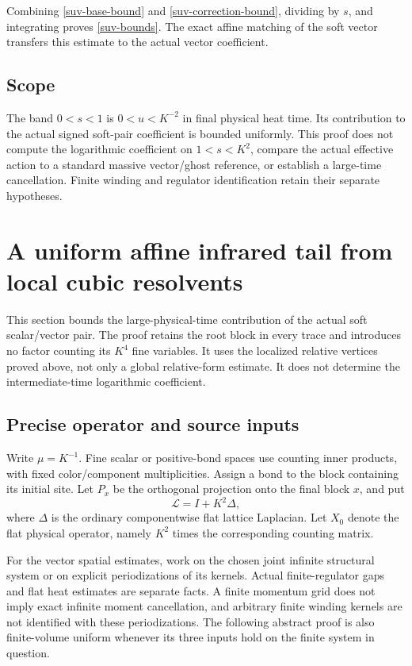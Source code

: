 \documentclass[11pt]{article}
\theoremstyle{remark}
\begin{document}
Combining \eqref{suv-base-bound} and \eqref{suv-correction-bound},
dividing by $s$, and integrating proves \eqref{suv-bounds}.
The exact affine matching of the soft vector transfers this estimate
to the actual vector coefficient.

\subsection{Scope}
\label{suv-scope}

The band $0<s<1$ is $0<u<K^{-2}$ in final physical heat time.
Its contribution to the actual signed soft-pair coefficient is bounded
uniformly. This proof does not compute the logarithmic coefficient on
$1<s<K^2$, compare the actual effective action to a standard massive
vector/ghost reference, or establish a large-time cancellation.
Finite winding and regulator identification retain their separate
hypotheses.


\section{A uniform affine infrared tail from local cubic resolvents}
\label{sft-section}

This section bounds the large-physical-time contribution of the actual
soft scalar/vector pair. The proof retains the root block in every
trace and introduces no factor counting its \(K^4\) fine variables.
It uses the localized relative vertices proved above, not only a
global relative-form estimate. It does not determine the
intermediate-time logarithmic coefficient.

\subsection{Precise operator and source inputs}
\label{sft-input-section}

Write \(\mu=K^{-1}\). Fine scalar or positive-bond spaces use counting
inner products, with fixed color/component multiplicities. Assign a
bond to the block containing its initial site. Let \(P_x\) be the
orthogonal projection onto the final block \(x\), and put
\begin{equation}
 \mathcal L=I+K^2\Delta,
 \label{sft-reference}
\end{equation}
where \(\Delta\) is the ordinary componentwise flat lattice Laplacian.
Let \(X_0\) denote the flat physical operator, namely \(K^2\) times
the corresponding counting matrix.

For the vector spatial estimates, work on the chosen joint infinite
structural system or on explicit periodizations of its kernels.
Actual finite-regulator gaps and flat heat estimates are separate
facts. A finite momentum grid does not imply exact infinite moment
cancellation, and arbitrary finite winding kernels are not identified
with these periodizations. The following abstract proof is also
finite-volume uniform whenever its three inputs hold on the finite
system in question.
\end{document}
